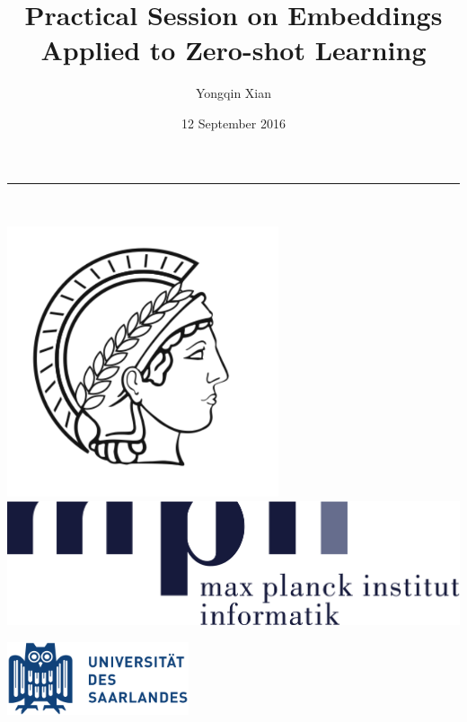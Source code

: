 \documentclass[mathserif, xcolor=table]{beamer}
\title{Practical Session on Embeddings Applied to Zero-shot Learning}
\author{Yongqin Xian \vspace{2mm}\\}
\institute{Max-Planck Institute for Informatics}
\date{12 September 2016}
\begin{document}

\begin{frame}
\color{jblue}\rule{4.3in}{0.02\paperwidth} \\ \vspace{-2mm}
\begin{minipage}{0.2\textwidth}
\includegraphics[width=0.6\textwidth,trim=0 -40 0 0]{minerva_solo.pdf}
\includegraphics[width=1.2\textwidth,trim=0 -300 0 0]{Logo_MPII}
\end{minipage}
\hfill
\begin{minipage}{0.5\textwidth} \hfill
\includegraphics[width=0.4\textwidth,trim=0 -30 50 0]{SaarlandUni}
\end{minipage}
\titlepage
\end{frame}
\end{document}
